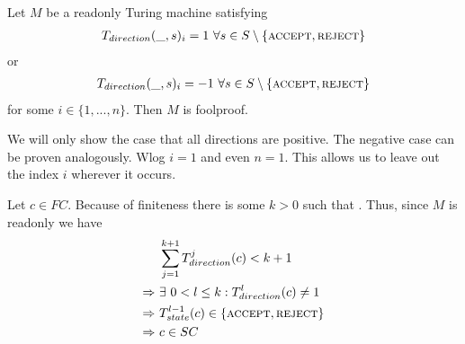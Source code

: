 \begin{Lemma}
	Let $M$ be a readonly Turing machine satisfying
	\begin{align*}
		T_{direction} (\_,s)_i = 1~\forall s \in S \setminus \{\text{\scshape{accept}},\text{\scshape{reject}}\}
	\end{align*}
	or
	\begin{align*}
		T_{direction} (\_,s)_i = -1~\forall s \in S \setminus \{\text{\scshape{accept}},\text{\scshape{reject}}\}
	\end{align*}
	for some $i \in \{1,...,n\}$.
	Then $M$ is foolproof.
\end{Lemma}
\proof
We will only show the case that all directions are positive. The negative case can be proven analogously.
Wlog $i=1$ and even $n=1$. This allows us to leave out the index $i$ wherever it occurs.

Let $c \in FC$. Because of finiteness there is some $k > 0$ such that .
Thus, since $M$ is readonly we have
\begin{align*}
	&\sum_{j=1}^{k+1} T_{direction}^j (c) < k+1 \\
	\Rightarrow~&\exists~0 < l \leq k: T_{direction}^l (c) \neq 1 \\
	\Rightarrow~&T_{state}^{l-1} (c) \in \{\text{\scshape{accept}},\text{\scshape{reject}}\} \\
	\Rightarrow~&c \in SC
\end{align*}
\endproof

